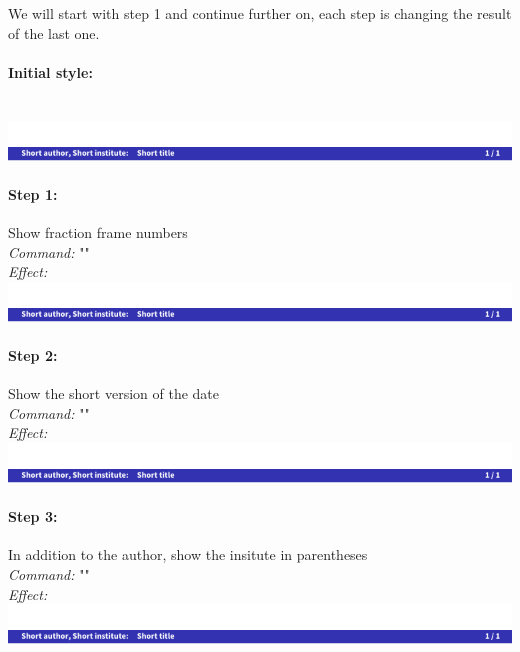 \documentclass[11pt]{ltxdoc}
\begin{document}
	\medskip
	We will start with step 1 and continue further on, each step is changing the result of the last one.
	
	\paragraph{Initial style:}~ \\
	\includegraphics[page=4, width=\textwidth, trim=0 0 0 15, clip]{hackthefootline-examples}
	
	\paragraph{Step 1:} Show fraction frame numbers \\
	\textit{Command:} "" \\
	\textit{Effect:} \\
	\includegraphics[page=5, width=\textwidth, trim=0 0 0 15, clip]{hackthefootline-examples}
	
	\paragraph{Step 2:} Show the short version of the date \\
	\textit{Command:} "" \\
	\textit{Effect:} \\
	\includegraphics[page=6, width=\textwidth, trim=0 0 0 15, clip]{hackthefootline-examples}
	
	\paragraph{Step 3:} In addition to the author, show the insitute in parentheses \\
	\textit{Command:} "" \\
	\textit{Effect:} \\
	\includegraphics[page=7, width=\textwidth, trim=0 0 0 15, clip]{hackthefootline-examples}
	
\end{document}
